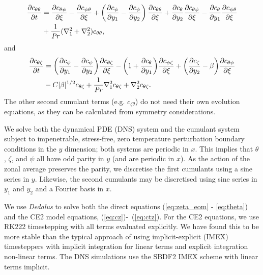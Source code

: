 \documentclass{jfm}
\newcommand{\cz}{c_{\zeta}}
\newcommand{\cs}{c_{\psi}}
\newcommand{\ct}{c_{\theta}}
\newcommand{\csz}{c_{\psi \zeta}}
\newcommand{\ctz}{c_{\theta \zeta}}
\newcommand{\czt}{c_{\zeta \theta}}
\newcommand{\ctt}{c_{\theta \theta}}
\newcommand{\cst}{c_{\psi \theta}}
\newcommand{\cts}{c_{\theta \psi}}
\begin{document}
\begin{equation}
  \label{eq:ctt}
\begin{split}
  \pdv{\ctt}{t} &= \pdv{\cts}{\xi} - \pdv{\cst}{\xi} + \left(\pdv{\cs}{y_1} - \pdv{\cs}{y_2}\right)\pdv{\ctt}{\xi} + \pdv{\ct}{y_2}\pdv{\cts}{\xi} - \pdv{\ct}{y_1}\pdv{\cst}{\xi}\\
&  + \frac{1}{\Pran}(\nabla_1^2 + \nabla_2^2) \ctt,
\end{split}
\end{equation}
and
\begin{equation}
  \label{eq:ctz}
  \begin{split}
    \pdv{\ctz}{t} &= \qty(\pdv{\cs}{y_1} - \pdv{\cs}{y_2}) \pdv{\ctz}{\xi} - \qty(1 + \pdv{\ct}{y_1}) \pdv{\csz}{\xi} + \qty(\pdv{\cz}{y_2} - \beta) \pdv{\cts}{\xi}\\
    &  - C |\beta|^{1/2} \ctz + \frac{1}{\Pran} \nabla_1^2 \ctz + \nabla_2^2 \ctz.
  \end{split}
\end{equation}
The other second cumulant terms (e.g. $\czt$) do not need their own evolution equations, as they can be calculated from symmetry considerations.

We solve both the dynamical PDE (DNS) system and the cumulant system subject to impenetrable, stress-free, zero temperature perturbation boundary conditions in the $y$ dimension; both systems are periodic in $x$. 
This implies that $\theta$, $\zeta$, and $\psi$ all have odd parity in $y$ (and are periodic in $x$). As
the action of the zonal average preserves the parity, we discretise the first cumulants using a sine series in $y$. Likewise,
the second cumulants may be discretised using sine series in $y_1$ and $y_2$ and a Fourier basis in $x$.

We use \emph{Dedalus} \citep{2020PhRvR...2b3068B} to solve both the direct equations (\ref{eq:zeta_eom} - \ref{eq:theta}) and the CE2 model equations, (\ref{eq:cz})-~(\ref{eq:ctz}).
For the CE2 equations, we use RK222 timestepping with all terms evaluated explicitly.
We have found this to be more stable than the typical approach of using implicit-explicit (IMEX) timesteppers with implicit integration for linear terms and explicit integration non-linear terms.
The DNS simulations use the SBDF2 IMEX scheme with linear terms implicit.
\end{document}
